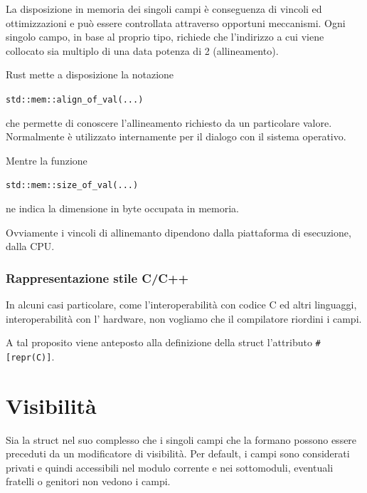La disposizione in memoria dei singoli campi è conseguenza di vincoli ed
ottimizzazioni e può essere controllata attraverso opportuni meccanismi.
Ogni singolo campo, in base al proprio tipo, richiede che l'indirizzo a cui
viene collocato sia multiplo di una data potenza di 2 (allineamento).


Rust mette a disposizione la notazione

\begin{center}
  \centering
  \texttt{std::mem::align_of_val(...) }
\end{center}
che permette di conoscere l'allineamento richiesto da un particolare valore.
Normalmente è utilizzato internamente per il dialogo con il sistema operativo.

Mentre la funzione

\begin{center}
  \centering
  \texttt{std::mem::size_of_val(...) }
\end{center}

ne indica la dimensione in byte occupata in memoria.

Ovviamente i vincoli di allinemanto dipendono dalla piattaforma di esecuzione,
dalla CPU.

\subsubsection{Rappresentazione stile C/C++}

In alcuni casi particolare, come l'interoperabilità con codice C ed altri linguaggi,
interoperabilità con l' hardware, non vogliamo che il compilatore riordini i campi.

A tal proposito viene anteposto alla definizione della struct l'attributo \texttt{#[repr(C)]}.




\section{Visibilità}

Sia la struct nel suo complesso che i singoli campi che la formano possono
essere preceduti da un modificatore di visibilità.
Per default, i campi sono considerati privati e quindi accessibili nel modulo corrente e nei
sottomoduli, eventuali fratelli o genitori non vedono i campi.

